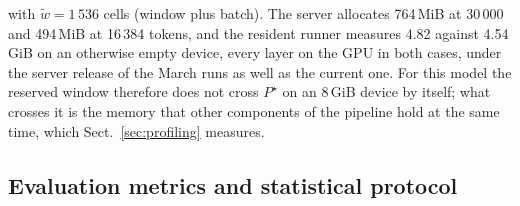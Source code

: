 \documentclass[pdflatex,sn-mathphys-num]{sn-jnl}
\newif\ifprovenance
\newcommand{\verify}[1]{\ifprovenance\textcolor{red}{{\footnotesize [VERIFY: #1]}}\fi}
\theoremstyle{thmstyleone}%
\theoremstyle{thmstylethree}%
\begin{document}
with $\tilde w=1\,536$ cells (window plus batch). The server allocates 764\,MiB at 30\,000 and 494\,MiB at 16\,384 tokens, and the resident runner measures 4.82 against 4.54\,GiB on an otherwise empty device, every layer on the GPU in both cases, under the server release of the March runs as well as the current one.\verify{cache: \texttt{llama\_kv\_cache} lines (590 + 174 and 320 + 174\,MiB) in the \texttt{log} field of \texttt{RnD/verification/ollama\_offload\_pressure\_v0.35.1\_ballast0.json} and the \texttt{required.CUDA0.Cache} vector ($5\times123\,731\,968 + 29\times6\,291\,456$ bytes) in \texttt{\ldots\_v0.17.5\_ballast0.json}; Eq.~\eqref{eq:kv-iswa} with $n_{kv}=4$, $d_h=256$, $b=2$, 30\,208 cells reproduces 764\,MiB; footprint: (\texttt{peak\_mib} $-$ \texttt{idle\_mib})/1024 of \texttt{RnD/verification/ollama\_runner\_vram.json} (4\,947 and 4\,663\,MiB, Ollama 0.35.1; 4\,995 and 4\,711\,MiB with 0.17.5 in \texttt{ollama\_offload\_pressure\_v0.17.5\_ballast0.json}); ``offloaded 35/35 layers'' in both logs; scripts \texttt{ollama\_runner\_vram.py}, \texttt{ollama\_offload\_under\_vram\_pressure.py}} For this model the reserved window therefore does not cross $P^{\star}$ on an 8\,GiB device by itself; what crosses it is the memory that other components of the pipeline hold at the same time, which Sect.~\ref{sec:profiling} measures.

\subsection{Evaluation metrics and statistical protocol}\label{sec:metrics}
\end{document}
